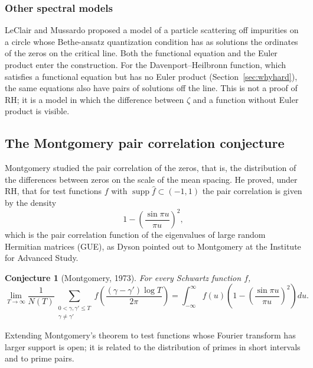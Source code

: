 \documentclass[11pt]{amsart}
\newtheorem{conjecture}[theorem]{Conjecture}
\theoremstyle{definition}
\theoremstyle{remark}
\begin{document}
\subsubsection{Other spectral models}

LeClair and Mussardo \cite{leclair2024} proposed a model of a particle scattering off impurities on a circle whose Bethe-ansatz quantization condition has as solutions the ordinates of the zeros on the critical line. Both the functional equation and the Euler product enter the construction. For the Davenport--Heilbronn function, which satisfies a functional equation but has no Euler product (Section~\ref{sec:whyhard}), the same equations also have pairs of solutions off the line. This is not a proof of RH; it is a model in which the difference between $\zeta$ and a function without Euler product is visible.

\subsection{The Montgomery pair correlation conjecture}\label{sec:montgomery}

Montgomery \cite{montgomery1973} studied the pair correlation of the zeros, that is, the distribution of the differences between zeros on the scale of the mean spacing. He proved, under RH, that for test functions $f$ with $\operatorname{supp}\hat f\subset(-1,1)$ the pair correlation is given by the density
\[
1 - \left(\frac{\sin \pi u}{\pi u}\right)^2,
\]
which is the pair correlation function of the eigenvalues of large random Hermitian matrices (GUE), as Dyson pointed out to Montgomery at the Institute for Advanced Study.

\begin{conjecture}[Montgomery, 1973]\label{conj:montgomery}
For every Schwartz function $f$,
\[
\lim_{T \to \infty} \frac{1}{N(T)} \sum_{\substack{0 < \gamma, \gamma' \le T \\ \gamma \neq \gamma'}} f\!\left(\frac{(\gamma - \gamma')\log T}{2\pi}\right) = \int_{-\infty}^{\infty} f(u)\left(1 - \left(\frac{\sin \pi u}{\pi u}\right)^2\right) du.
\]
\end{conjecture}

Extending Montgomery's theorem to test functions whose Fourier transform has larger support is open; it is related to the distribution of primes in short intervals and to prime pairs.
\end{document}
